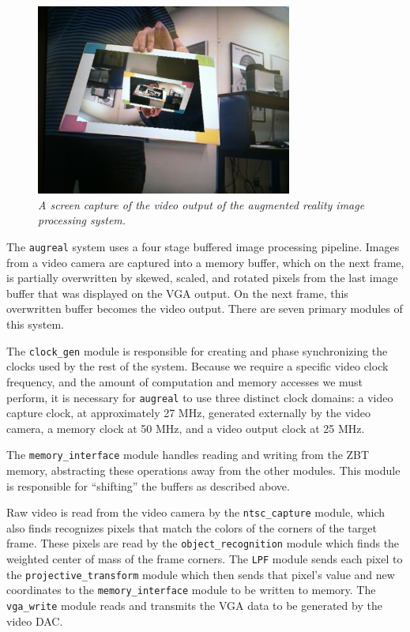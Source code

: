 \documentclass[10pt]{article}
\begin{document}
\begin{figure}[h!]
\centering
\includegraphics[width=0.75\textwidth]{images/IMG_0113.JPG}
\caption{\emph{A screen capture of the video output of the augmented reality image processing system.}}
\end{figure}

The {\tt augreal} system uses a four stage buffered image processing pipeline. Images from a video camera are captured into a memory buffer, which on the next frame, is partially overwritten by skewed, scaled, and rotated pixels from the last image buffer that was displayed on the VGA output. On the next frame, this overwritten buffer becomes the video output. There are seven primary modules of this system.

The {\tt clock\_gen} module is responsible for creating and phase synchronizing the clocks used by the rest of the system. Because we require a specific video clock frequency, and the amount of computation and memory accesses we must perform, it is necessary for {\tt augreal} to use three distinct clock domains: a video capture clock, at approximately 27 MHz, generated externally by the video camera, a memory clock at 50 MHz, and a video output clock at 25 MHz.

The {\tt memory\_interface} module handles reading and writing from the ZBT memory, abstracting these operations away from the other modules. This module is responsible for ``shifting'' the buffers as described above.

Raw video is read from the video camera by the {\tt ntsc\_capture} module, which also finds recognizes pixels that match the colors of the corners of the target frame. These pixels are read by the {\tt object\_recognition} module which finds the weighted center of mass of the frame corners. The {\tt LPF} module sends each pixel to the {\tt projective\_transform} module which then sends that pixel's value and new coordinates to the {\tt memory\_interface} module to be written to memory. The {\tt vga\_write} module reads and transmits the VGA data to be generated by the video DAC.
\end{document}
